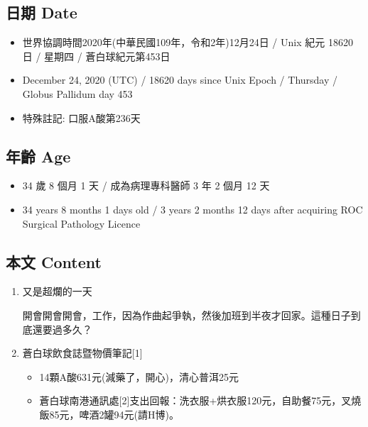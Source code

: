 \documentclass[
]{article}
\providecommand{\tightlist}{%
  \setlength{\itemsep}{0pt}\setlength{\parskip}{0pt}}
\begin{document}
\hypertarget{ux65e5ux671f-date-23}{%
\subsection{日期 Date}\label{ux65e5ux671f-date-23}}

\begin{itemize}
\tightlist
\item
  世界協調時間2020年(中華民國109年，令和2年)12月24日 / Unix 紀元 18620
  日 / 星期四 / 蒼白球紀元第453日
\item
  December 24, 2020 (UTC) / 18620 days since Unix Epoch / Thursday /
  Globus Pallidum day 453
\item
  特殊註記: 口服A酸第236天
\end{itemize}

\hypertarget{ux5e74ux9f61-age-23}{%
\subsection{年齡 Age}\label{ux5e74ux9f61-age-23}}

\begin{itemize}
\tightlist
\item
  34 歲 8 個月 1 天 / 成為病理專科醫師 3 年 2 個月 12 天
\item
  34 years 8 months 1 days old / 3 years 2 months 12 days after
  acquiring ROC Surgical Pathology Licence
\end{itemize}

\hypertarget{ux672cux6587-content-23}{%
\subsection{本文 Content}\label{ux672cux6587-content-23}}

\begin{enumerate}
\def\labelenumi{\arabic{enumi}.}
\item
  又是超爛的一天

  開會開會開會，工作，因為作曲起爭執，然後加班到半夜才回家。這種日子到底還要過多久？
\item
  蒼白球飲食誌暨物價筆記{[}1{]}

  \begin{itemize}
  \tightlist
  \item
    14顆A酸631元(減藥了，開心)，清心普洱25元
  \item
    蒼白球南港通訊處{[}2{]}支出回報：洗衣服+烘衣服120元，自助餐75元，叉燒飯85元，啤酒2罐94元(請H博)。
  \end{itemize}
\end{enumerate}
\end{document}
